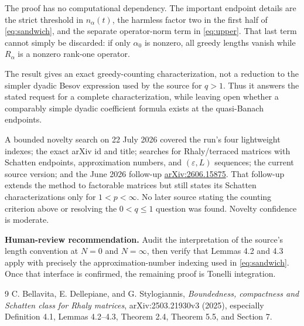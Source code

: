 \documentclass[11pt]{article}
\begin{document}
The proof has no computational dependency.  The important endpoint details
are the strict threshold in $n_\alpha(t)$, the harmless factor two in the
first half of \eqref{eq:sandwich}, and the separate operator-norm term in
\eqref{eq:upper}.  That last term cannot simply be discarded: if only
$\alpha_0$ is nonzero, all greedy lengths vanish while $R_\alpha$ is a
nonzero rank-one operator.

The result gives an exact greedy-counting characterization, not a reduction
to the simpler dyadic Besov expression used by the source for $q>1$.  Thus it
answers the stated request for a complete characterization, while leaving
open whether a comparably simple dyadic coefficient formula exists at the
quasi-Banach endpoints.

A bounded novelty search on 22 July 2026 covered the run's four lightweight
indexes; the exact arXiv id and title; searches for Rhaly/terraced matrices
with Schatten endpoints, approximation numbers, and $(\varepsilon,L)$
sequences; the current source version; and the June 2026 follow-up
\href{https://arxiv.org/abs/2606.15875}{arXiv:2606.15875}.  That follow-up
extends the method to factorable matrices but still states its Schatten
characterizations only for $1<p<\infty$.  No later source stating the
counting criterion above or resolving the $0<q\leq1$ question was found.
Novelty confidence is moderate.

\textbf{Human-review recommendation.}  Audit the interpretation of the
source's length convention at $N=0$ and $N=\infty$, then verify that Lemmas
4.2 and 4.3 apply with precisely the approximation-number indexing used in
\eqref{eq:sandwich}.  Once that interface is confirmed, the remaining proof
is Tonelli integration.

\begin{thebibliography}{9}
C. Bellavita, E. Dellepiane, and G. Stylogiannis,
\emph{Boundedness, compactness and Schatten class for Rhaly matrices},
arXiv:2503.21930v3 (2025), especially Definition 4.1, Lemmas 4.2--4.3,
Theorem 2.4, Theorem 5.5, and Section 7.
\end{thebibliography}
\end{document}

